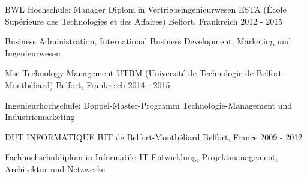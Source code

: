 

\begin{cventries}
\cventry
{BWL Hochschule: Manager Diplom in Vertriebsingenieurwesen} %
{ESTA (École Supérieure des Technologies et des Affaires)} %
{Belfort, Frankreich} %
{2012 - 2015} %
{
	\begin{cvitems} %
		\item {Business Administration, International Business Development, Marketing und Ingenieurwesen}
	\end{cvitems}
}

  \cventry
    {Msc Technology Management} %
    {UTBM (Université de Technologie de Belfort-Montbéliard)} %
    {Belfort, Frankreich} %
    {2014 - 2015} %
    {
      \begin{cvitems} %
        \item {Ingenieurhochschule: Doppel-Master-Programm Technologie-Management und Industriemarketing}
      \end{cvitems}
    }
    


  \cventry
    {DUT INFORMATIQUE} %
    {IUT de Belfort-Montbéliard} %
    {Belfort, France} %
    {2009 - 2012} %
    {
      \begin{cvitems} %
        \item {Fachhochschuldiplom in Informatik: IT-Entwicklung, Projektmanagement, Architektur und Netzwerke}
      \end{cvitems}
    }


\end{cventries}
